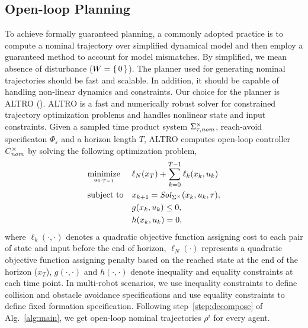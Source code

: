 

\subsection{Open-loop Planning}
To achieve formally guaranteed planning, a commonly adopted practice is to compute a nominal trajectory over simplified dynamical model and then employ a guaranteed method to account for model mismatches. By simplified, we mean absence of disturbance ($W=\set{0}$). The planner used for generating nominal trajectories should be fast and scalable. In addition, it should be capable of handling non-linear dynamics and constraints. Our choice for the planner is ALTRO (\cite{howell2019altro}). ALTRO is a fast and numerically robust solver for constrained trajectory optimization problems and handles nonlinear state and input constraints. Given a sampled time product system $\Sigma_{\tau,\mathit{nom}}^\times$, reach-avoid specificaton $\Phi_\varepsilon$ and a horizon length $T$, ALTRO computes open-loop controller $C^\times_{\mathit{nom}}$ by solving the following optimization problem,
\begin{equation*}
	\begin{aligned}
		& \underset{u_{0:T-1}}{\text{minimize}}
		& & \ell_N(x_T)+\sum_{k=0}^{T-1}\ell_k(x_k,u_k) \\
		& \text{subject to}
		& & x_{k+1}=\mathit{Sol}_{\Sigma^\times}(x_k,u_k,\tau),\\
		& & &  g(x_k,u_k)\leq 0,\\
		& & &  h(x_k,u_k)=0,
	\end{aligned}
\end{equation*}
where $\ell_k(\cdot,\cdot)$ denotes a quadratic objective function assigning cost to each pair of state and input before the end of horizon, $\ell_N(\cdot)$ represents a quadratic objective function assigning penalty based on the reached state at the end of the horizon ($x_T$), $g(\cdot,\cdot)$ and $h(\cdot,\cdot)$ denote inequality and equality constraints at each time point.
In multi-robot scenarios, we use inequality constraints to define collision and obstacle avoidance specifications and use equality constraints to define fixed formation specification. Following step~\ref{step:decompose} of Alg.~\ref{alg:main}, we get open-loop nominal trajectories $\rho^i$ for every agent.


